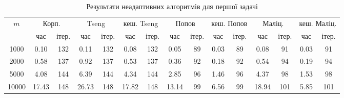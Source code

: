 \begin{table}[H]
    \centering
    \begin{tabular}{||c||c|c||c|c|c|c||c|c|c|c||c|c|c|c||} \hline \hline
        \multirow{2}{*}{$m$} & \multicolumn{2}{c||}{Корп.} & \multicolumn{2}{c|}{Tseng} & \multicolumn{2}{c||}{кеш. Tseng} & \multicolumn{2}{c|}{Попов} & \multicolumn{2}{c||}{кеш. Попов} & \multicolumn{2}{c|}{Маліц.} & \multicolumn{2}{c||}{кеш. Маліц.} \\ \cline{2-15}
         & час & ітер. & час & ітер. & час & ітер. & час & ітер. & час & ітер. & час & ітер. & час & ітер. \\ \hline \hline
        1000 & 0.10 & 132 & 0.11 & 132 & 0.08 & 132 & 0.05 & 89 & 0.03 & 89 & 0.08 & 91 & 0.03 & 91 \\ \hline
        2000 & 0.58 & 137 & 0.92 & 137 & 0.53 & 137 & 0.36 & 92 & 0.18 & 92 & 0.54 & 94 & 0.19 & 94 \\ \hline
        5000 & 4.08 & 144 & 6.39 & 144 & 4.34 & 144 & 2.85 & 96 & 1.46 & 96 & 4.37 & 98 & 1.53 & 98 \\ \hline
        10000 & 17.43 & 148 & 26.73 & 148 & 17.82 & 148 & 13.14 & 99 & 6.56 & 99 & 18.94 & 101 & 5.85 & 101 \\ \hline
        \hline
    \end{tabular}
    \caption{Результати  неадаптивних алгоритмів для першої задачі}
    \label{tab:1}
\end{table}
